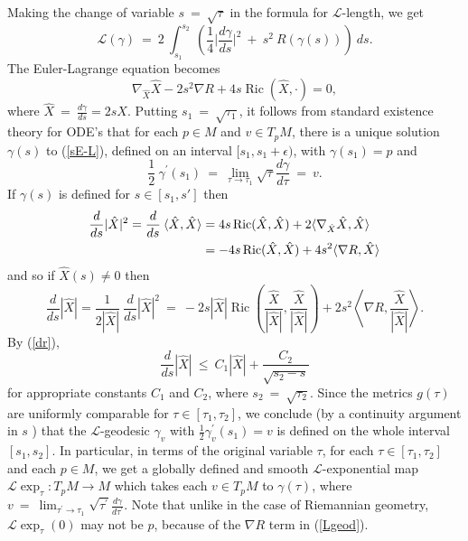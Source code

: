 \documentclass[12pt]{amsart}
\newcommand{\Ric}{\operatorname{Ric}}
\newcommand{\eps}{\epsilon}
\newcommand{\ra}{\rightarrow}
\numberwithin{equation}{section}
\theoremstyle{plain}
\theoremstyle{definition}
\theoremstyle{remark}
\begin{document}
Making the change of variable $s \: = \: \sqrt{\tau}$ in the formula
for ${\mathcal L}$-length, we get
\begin{equation}
\label{changetos}
{\mathcal L}(\gamma) \: = \: 
2 \: \int_{s_1}^{s_2} \: \left( \frac14 
\Big| \frac{d\gamma}{ds} \Big|^2 \: + \:
s^2 \: R(\gamma(s)) \right) \: ds.
\end{equation}
The Euler-Lagrange equation becomes
\begin{equation}
\label{sE-L}
\nabla_{\hat X}\hat X-2s^2\nabla R+4s\Ric(\hat X,\cdot)=0,
\end{equation}
where $\hat X \: = \: \frac{d\gamma}{ds}=2sX$.
Putting $s_1 \: = \: \sqrt{\tau_1}$,
it follows from standard existence theory
for ODE's that for each $p \in M$ and $v\in T_pM$,
there is a unique solution $\gamma(s)$ to 
(\ref{sE-L}), defined on an interval $[s_1,s_1+\eps)$, with $\gamma(s_1) = p$
and
\begin{equation}
\frac{1}{2} \: \gamma^\prime(s_1) \: = \: 
\lim_{\tau\ra \tau_1}\sqrt{\tau}\frac{d\gamma}{d\tau} \: = \: v.
\end{equation}
If $\gamma(s)$ is defined for $s \in [s_1,s']$ then 
\begin{align}
\frac{d}{ds}|\hat X|^2=\frac{d}{ds} \: \langle \hat X,\hat X\rangle
&= 4s\Ric(\hat X,\hat X)+2\langle\nabla_{\hat X}\hat X,\hat X\rangle \\
&= - 4s\Ric(\hat X,\hat X) + 4s^2 \langle \nabla R, \hat X \rangle \notag
\end{align}
and so if $\hat X (s) \neq 0$ then
\begin{equation}
\frac{d}{ds}|\hat X|=
\frac{1}{2|\hat X|} \: \frac{d}{ds}|\hat X|^2 \: = \:
- 2s |\hat X|
 \Ric \left( \frac{\hat X}{|\hat X|}, \frac{\hat X}{|\hat X|} \right)
+ 2s^2 \left\langle \nabla R, \frac{\hat X}{|\hat X|} \right\rangle.
\end{equation}
By (\ref{dr}),
\begin{equation}
\frac{d}{ds}|\hat X| \: \le \: C_1 |\hat X| + 
\frac{C_2}{\sqrt{s_2 - s}}
\end{equation}
for appropriate constants $C_1$ and $C_2$, where
$s_2 \: = \: \sqrt{\tau_2}$.
Since the metrics $g(\tau)$
are uniformly comparable for $\tau\in [\tau_1,\tau_2]$, we conclude
(by a continuity argument 
in $s$
) that the ${\mathcal L}$-geodesic $\gamma_v$
with $\frac{1}{2} \gamma_v^\prime(s_1)=v$ is defined on the whole 
interval 
$[s_1,s_2]$.
In particular, in terms of the original variable $\tau$,
for each 
${\tau}\in [\tau_1,\tau_2]$
and each $p\in M$,
we get a globally defined and smooth ${\mathcal L}$-exponential map
${\mathcal L}\exp_\tau:T_pM\ra M$ which takes each $v\in T_pM$
to $\gamma({\tau})$, where $v \: = \: \lim_{\tau^\prime \rightarrow \tau_1}
\sqrt{\tau^\prime} \frac{d\gamma}{d\tau^\prime}$.
Note that unlike in the case of Riemannian geometry, 
${\mathcal L}\exp_\tau(0)$ may
not be $p$, because of the $\nabla R$ term in
(\ref{Lgeod}).
\end{document}

